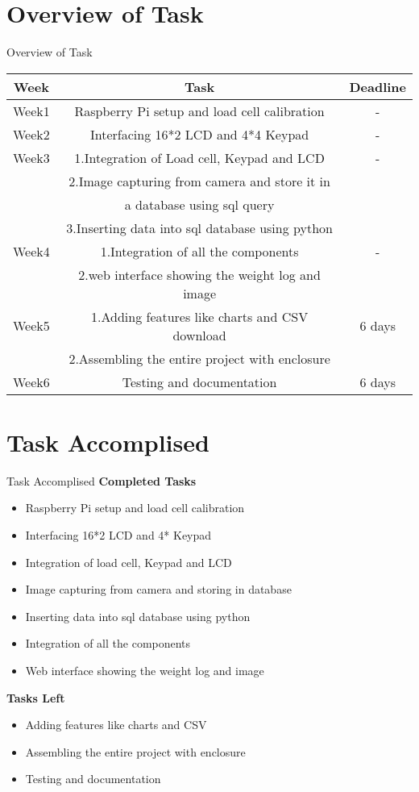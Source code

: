 \documentclass[10pt, a4paper]{beamer}
\begin{document}
\section{Overview of Task}
\begin{frame}{Overview of Task}
	\begin{tabular}{|c|c|C|}
		\hline	
		Week&Task&Deadline\\	
		\hline\hline
		Week1&Raspberry Pi setup and load cell calibration&-\\
		\hline\hline
		Week2&Interfacing 16*2 LCD and 4*4 Keypad&-\\
		\hline\hline
		Week3&1.Integration of Load cell, Keypad and LCD&-\\
		$   $&2.Image capturing from camera and store it in &$ $ \\
		$   $&a database using sql query&$ $\\
		$   $&3.Inserting data into sql database using python&$ $\\
		\hline\hline
		Week4&1.Integration of all the components&-\\
		$   $&2.web interface showing the weight log and image&$ $\\
		\hline\hline
		Week5&1.Adding features like charts and CSV download&6 days\\
		$	$&2.Assembling the entire project with enclosure&$ $\\
		\hline\hline
		Week6&Testing and documentation&6 days\\
		\hline			
	\end{tabular}
\end{frame}

\section{Task Accomplised}
\begin{frame}{Task Accomplised}
	\textbf{Completed Tasks}
	\begin{itemize}		
		\item Raspberry Pi setup and load cell calibration
		\item Interfacing 16*2 LCD and 4* Keypad
		\item Integration of load cell, Keypad and LCD 
		\item Image capturing from camera and storing in database
		\item Inserting data into sql database using python
		\item Integration of all the components
		\item Web interface showing the weight log and image
	\end{itemize}	
		\textbf{Tasks Left}
	\begin{itemize}	
		\item Adding features like charts and CSV
		\item Assembling the entire project with enclosure
		\item Testing and documentation
	\end{itemize}
\end{frame}
\end{document}
